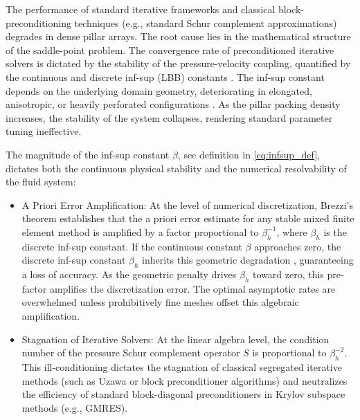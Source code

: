 \documentclass{elsarticle}
\begin{document}
The performance of standard iterative frameworks and classical block-preconditioning techniques (e.g., standard Schur complement approximations) degrades in dense pillar arrays. The root cause lies in the mathematical structure of the saddle-point problem. The convergence rate of preconditioned iterative solvers is dictated by the stability of the pressure-velocity coupling, quantified by the continuous and discrete inf-sup (LBB) constants \cite{boffi2013mixed, Mardal2010, loghin2004analysis}. The inf-sup constant depends on the underlying domain geometry, deteriorating in elongated, anisotropic, or heavily perforated configurations \cite{Chizhonkov2000, Dobrowolski2003, sande2025robust}. As the pillar packing density increases, the stability of the system collapses, rendering standard parameter tuning ineffective.

The magnitude of the inf-sup constant $\beta$, see definition in \eqref{eq:infsup_def}, dictates both the continuous physical stability and the numerical resolvability of the fluid system:
\begin{itemize}
    \item {A Priori Error Amplification:} At the level of numerical discretization, Brezzi's theorem \cite{Brezzi1974, boffi2013mixed, Girault1986, Ern2004} establishes that the a priori error estimate for any stable mixed finite element method is amplified by a factor proportional to $\beta_h^{-1}$, where $\beta_h$ is the discrete inf-sup constant. If the continuous constant $\beta$ approaches zero, the discrete inf-sup constant $\beta_h$ inherits this geometric degradation \cite{boffi2013mixed}, guaranteeing a loss of accuracy. As the geometric penalty drives $\beta_h$ toward zero, this pre-factor amplifies the discretization error. The optimal asymptotic rates are overwhelmed unless prohibitively fine meshes offset this algebraic amplification.
    \item {Stagnation of Iterative Solvers:} At the linear algebra level, the condition number of the pressure Schur complement operator $S$ is proportional to $\beta_h^{-2}$. This ill-conditioning dictates the stagnation of classical segregated iterative methods (such as Uzawa or block preconditioner algorithms) \cite{Mardal2010,Bacuta2006} and neutralizes the efficiency of standard block-diagonal preconditioners in Krylov subspace methods (e.g., GMRES).
\end{itemize}
\end{document}
